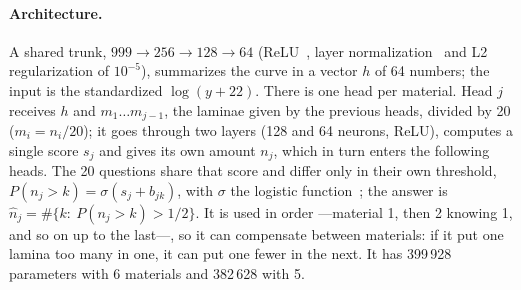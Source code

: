 \paragraph{Architecture.} A shared trunk, $999\to256\to128\to64$ (ReLU~\cite{relu}, layer normalization~\cite{layernorm} and L2 regularization of $10^{-5}$), summarizes the curve in a vector $h$ of 64 numbers; the input is the standardized $\log(y+22)$. There is one head per material. Head $j$ receives $h$ and $m_1\ldots m_{j-1}$, the laminae given by the previous heads, divided by 20 ($m_i=n_i/20$); it goes through two layers (128 and 64 neurons, ReLU), computes a single score $s_j$ and gives its own amount $n_j$, which in turn enters the following heads. The 20 questions share that score and differ only in their own threshold, $P(n_j>k)=\sigma(s_j+b_{jk})$, with $\sigma$ the logistic function~\cite{cao}; the answer is $\hat n_j=\#\{k:\ P(n_j>k)>1/2\}$. It is used in order ---material 1, then 2 knowing 1, and so on up to the last---, so it can compensate between materials: if it put one lamina too many in one, it can put one fewer in the next. It has 399\,928 parameters with 6 materials and 382\,628 with 5.

